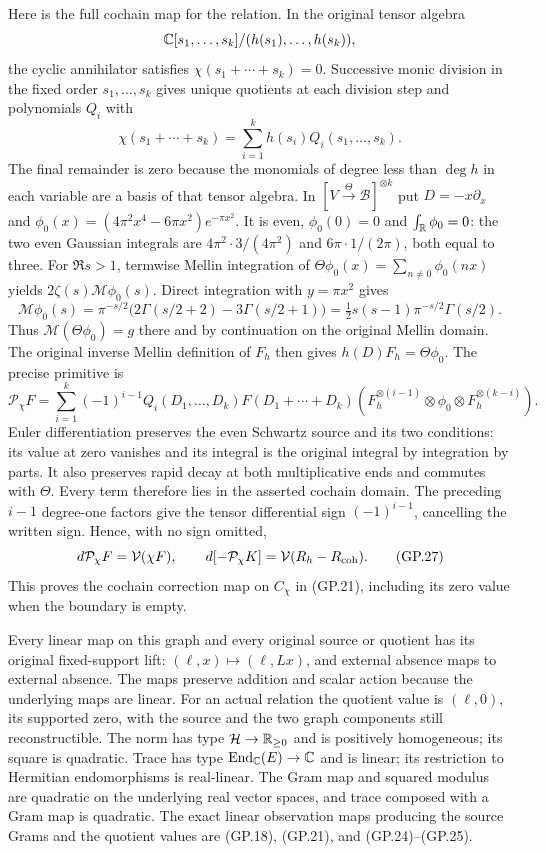 Here is the full cochain map for the relation. In the original tensor algebra
\[
 \mathbb C[s_1,\ldots,s_k]/(h(s_1),\ldots,h(s_k)),
\]
the cyclic annihilator satisfies $\chi(s_1+\cdots+s_k)=0$. Successive monic
division in the fixed order $s_1,\ldots,s_k$ gives unique quotients
at each division step and polynomials $Q_i$ with
\[
 \chi(s_1+\cdots+s_k)=\sum_{i=1}^k h(s_i)Q_i(s_1,\ldots,s_k).
\]
The final remainder is zero because the monomials of degree less
than $\deg h$ in each variable are a basis of that tensor algebra.
In $[V\xrightarrow{\Theta}\mathscr B]^{\otimes k}$ put
$D=-x\partial_x$ and
$\phi_0(x)=(4\pi^2x^4-6\pi x^2)e^{-\pi x^2}$. It is even,
$\phi_0(0)=0$ and $\int_\mathbb R\phi_0=0$: the two even Gaussian
integrals are $4\pi^2\cdot3/(4\pi^2)$ and
$6\pi\cdot1/(2\pi)$, both equal to three. For $\Re s>1$,
termwise Mellin integration of
$\Theta\phi_0(x)=\sum_{n\ne0}\phi_0(nx)$ yields
$2\zeta(s)\mathcal M\phi_0(s)$. Direct integration with
$y=\pi x^2$ gives
\[
 \mathcal M\phi_0(s)=\pi^{-s/2}
 \bigl(2\Gamma(s/2+2)-3\Gamma(s/2+1)\bigr)
 =\tfrac12s(s-1)\pi^{-s/2}\Gamma(s/2).
\]
Thus $\mathcal M(\Theta\phi_0)=g$ there and by continuation on
the original Mellin domain. The original inverse Mellin definition
of $F_h$ then gives $h(D)F_h=\Theta\phi_0$. The precise primitive is
\begin{equation}
 \mathcal P_\chi F=
 \sum_{i=1}^k(-1)^{i-1}Q_i(D_1,\ldots,D_k)
 F(D_1+\cdots+D_k)
 (F_h^{\otimes(i-1)}\otimes\phi_0\otimes F_h^{\otimes(k-i)}).
 \tag{GP.26}
\end{equation}
Euler differentiation preserves the even Schwartz source and its
two conditions: its value at zero vanishes and its integral is the
original integral by integration by parts. It also preserves rapid
decay at both multiplicative ends and commutes with $\Theta$.
Every term therefore lies in the asserted cochain domain. The
preceding $i-1$ degree-one factors give the tensor differential sign
$(-1)^{i-1}$, cancelling the written sign. Hence, with no sign omitted,
\begin{equation}
 d\mathcal P_\chi F=\mathcal V(\chi F),\qquad
 d[-\mathcal P_\chi K]=\mathcal V(R_h-R_{\rm coh}).
 \tag{GP.27}
\end{equation}
This proves the cochain correction map on $C_\chi$ in (GP.21),
including its zero value when the boundary is empty.

Every linear map on this graph and every original source or quotient
has its original fixed-support lift: $(\ell,x)\mapsto(\ell,Lx)$,
and external absence maps to external absence. The maps preserve
addition and scalar action because the underlying maps are linear.
For an actual relation the quotient value is $(\ell,0)$, its supported
zero, with the source and the two graph components still reconstructible.
The norm has type $\mathcal H\to\mathbb R_{\geq0}$ and is positively homogeneous;
its square is quadratic. Trace has type
$\operatorname{End}_{\mathbb C}(E)\to\mathbb C$ and is linear; its restriction to
Hermitian endomorphisms is real-linear. The Gram map and squared
modulus are quadratic on the underlying real vector spaces, and
trace composed with a Gram map is quadratic. The exact linear
observation maps producing the source Grams and the quotient values
are (GP.18), (GP.21), and (GP.24)--(GP.25).

